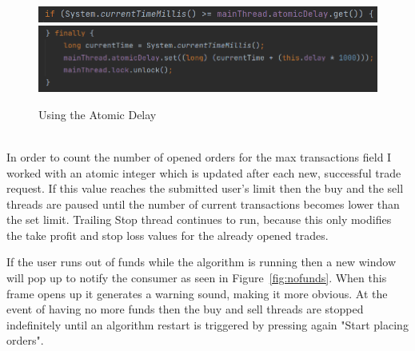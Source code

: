 \documentclass[12pt,a4paper]{report}
\begin{document}
\begin{figure}[!ht]
	\centering
	\includegraphics[scale=0.7]{pics/delay1.png}
	\includegraphics[scale=0.7]{pics/delay2.png}
	\caption{Using the Atomic Delay}
	\label{fig:delay}
\end{figure}
\\
In order to count the number of opened orders for the max transactions field I worked with an atomic integer which is updated after each new, successful trade request. If this value reaches the submitted user's limit then the buy and the sell threads are paused until the number of current transactions becomes lower than the set limit. Trailing Stop thread continues to run, because this only modifies the take profit and stop loss values for the already opened trades.

If the user runs out of funds while the algorithm is running then a new window will pop up to notify the consumer as seen in Figure~\ref{fig:nofunds}. When this frame opens up it generates a warning sound, making it more obvious. At the event of having no more funds then the buy and sell threads are stopped indefinitely until an algorithm restart is triggered by pressing again "Start placing orders".  
\end{document}
